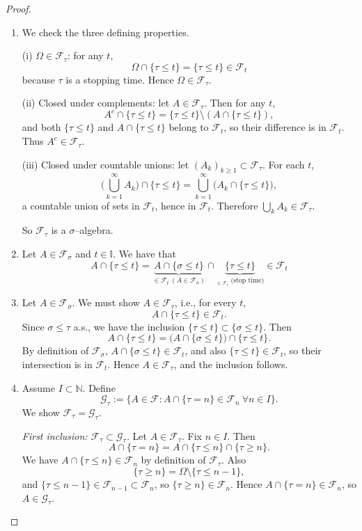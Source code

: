\documentclass[11pt,a4paper]{article}
\theoremstyle{definition}
\begin{document}
\begin{proof} $ $ 
    \begin{enumerate}
        \item We check the three defining properties.

(i) $\Omega\in\mathcal{F}_\tau$:
for any $t$,
\[
\Omega\cap\{\tau\le t\} = \{\tau\le t\}\in\mathcal{F}_t
\]
because $\tau$ is a stopping time. Hence $\Omega\in\mathcal{F}_\tau$.

(ii) Closed under complements: let $A\in\mathcal{F}_\tau$. Then for any $t$,
\[
A^c \cap \{\tau\le t\}
= \{\tau\le t\}\setminus (A\cap\{\tau\le t\}),
\]
and both $\{\tau\le t\}$ and $A\cap\{\tau\le t\}$ belong to $\mathcal{F}_t$,
so their difference is in $\mathcal{F}_t$. Thus $A^c\in\mathcal{F}_\tau$.

(iii) Closed under countable unions: let $(A_k)_{k\ge1}\subset\mathcal{F}_\tau$.
For each $t$,
\[
\Big( \bigcup_{k=1}^\infty A_k \Big)\cap\{\tau\le t\}
= \bigcup_{k=1}^\infty \big(A_k\cap\{\tau\le t\}\big),
\]
a countable union of sets in $\mathcal{F}_t$, hence in $\mathcal{F}_t$.
Therefore $\bigcup_k A_k\in\mathcal{F}_\tau$.

So $\mathcal{F}_\tau$ is a $\sigma$--algebra.
        \item Let $A \in \mathcal{F}_\sigma $ and $t \in \mathbb{I}$. We have that \[
        A \cap \{\tau \le t\} = \underbrace{A \cap \{\sigma \le t\}}_{\in \mathcal{F}_t \ (A \in \mathcal{F}_\sigma)  } \cap \underbrace{\{\tau \le t\}}_{_{\in \mathcal{F}_t } \text{ (stop time)}} \in \mathcal{F}_t
        \]
        \item Let $A\in\mathcal{F}_\sigma$. We must show $A\in\mathcal{F}_\tau$, i.e.,
for every $t$,
\[
A\cap\{\tau\le t\} \in \mathcal{F}_t.
\]
Since $\sigma\le\tau$ a.s., we have the inclusion
\(\{\tau\le t\}\subset\{\sigma\le t\}\). Then
\[
A\cap\{\tau\le t\}
= \big(A\cap\{\sigma\le t\}\big)\cap\{\tau\le t\}.
\]
By definition of $\mathcal{F}_\sigma$, $A\cap\{\sigma\le t\}\in\mathcal{F}_t$,
and also $\{\tau\le t\}\in\mathcal{F}_t$, so their intersection is in
$\mathcal{F}_t$. Hence $A\in\mathcal{F}_\tau$, and the inclusion follows.
\item Assume $I\subset\mathbb{N}$.  
Define
\[
\mathcal{G}_\tau := \big\{ A\in\mathcal{F}:
      A\cap\{\tau=n\}\in\mathcal{F}_n \ \forall n\in I \big\}.
\]
We show $\mathcal{F}_\tau = \mathcal{G}_\tau$.

\emph{First inclusion: $\mathcal{F}_\tau \subset \mathcal{G}_\tau$.}
Let $A\in\mathcal{F}_\tau$. Fix $n\in I$. Then
\[
A\cap\{\tau=n\}
= A\cap\{\tau\le n\}\cap\{\tau\ge n\}.
\]
We have $A\cap\{\tau\le n\}\in\mathcal{F}_n$ by definition of $\mathcal{F}_\tau$.
Also
\[
\{\tau\ge n\} = \Omega\setminus\{\tau\le n-1\},
\]
and $\{\tau\le n-1\}\in\mathcal{F}_{n-1}\subset\mathcal{F}_n$, so
$\{\tau\ge n\}\in\mathcal{F}_n$. Hence
$A\cap\{\tau=n\}\in\mathcal{F}_n$, so $A\in\mathcal{G}_\tau$.


\end{enumerate}
\end{proof}
\end{document}
